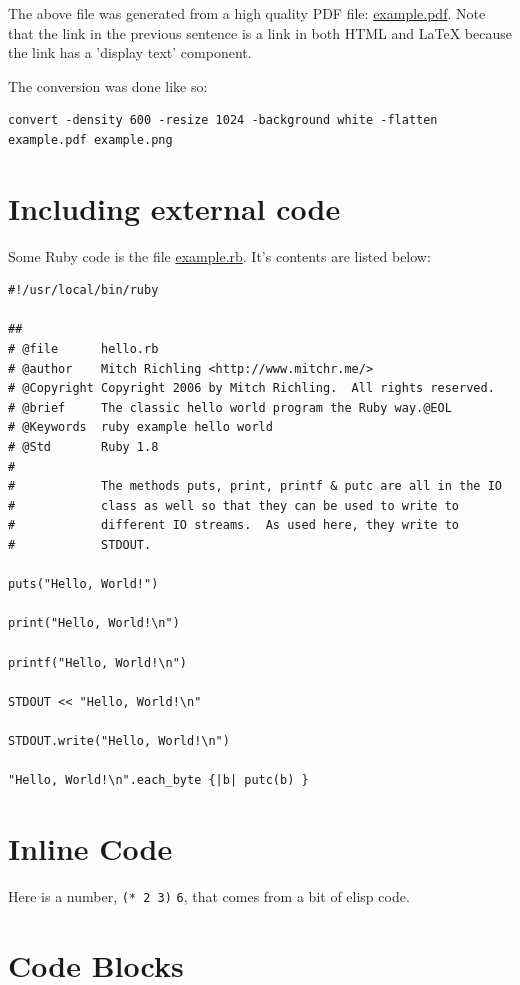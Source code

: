 \documentclass[11pt]{article}
\begin{document}
The above file was generated from a high quality PDF file: \href{example.pdf}{example.pdf}. Note that the link in the previous sentence is a link in both HTML and \LaTeX{} because
the link has a 'display text' component.

The conversion was done like so:

\begin{verbatim}
convert -density 600 -resize 1024 -background white -flatten example.pdf example.png
\end{verbatim}

\section{Including external code}
\label{sec:org6cbcca9}

Some Ruby code is the file \url{example.rb}.  It's contents are listed below:

\begin{verbatim}
#!/usr/local/bin/ruby

##
# @file      hello.rb
# @author    Mitch Richling <http://www.mitchr.me/>
# @Copyright Copyright 2006 by Mitch Richling.  All rights reserved.
# @brief     The classic hello world program the Ruby way.@EOL
# @Keywords  ruby example hello world
# @Std       Ruby 1.8
#
#            The methods puts, print, printf & putc are all in the IO
#            class as well so that they can be used to write to
#            different IO streams.  As used here, they write to
#            STDOUT.

puts("Hello, World!")

print("Hello, World!\n")

printf("Hello, World!\n")

STDOUT << "Hello, World!\n"

STDOUT.write("Hello, World!\n")

"Hello, World!\n".each_byte {|b| putc(b) }
\end{verbatim}

\section{Inline Code}
\label{sec:org32dbc4c}

Here is a number, \texttt{(* 2 3)} \texttt{6}, that comes from a bit of elisp code.

\section{Code Blocks}
\label{sec:orga376a6c}
\end{document}
